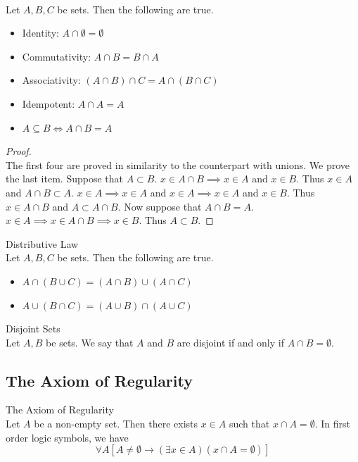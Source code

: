 \documentclass[a4paper]{article}
\begin{document}
\begin{prp}{}{}\\
Let $A,B,C$ be sets. Then the following are true. 
\begin{itemize}
\item Identity: $A\cap\emptyset=\emptyset$
\item Commutativity: $A\cap B=B\cap A$
\item Associativity: $(A\cap B)\cap C=A\cap(B\cap C)$
\item Idempotent: $A\cap A=A$
\item $A\subseteq B\iff A\cap B=A$
\end{itemize}
\begin{proof}\\
The first four are proved in similarity to the counterpart with unions. We prove the last item. Suppose that $A\subset B$. $x\in A\cap B\implies x\in A$ and $x\in B$. Thus $x\in A$ and $A\cap B\subset A$. $x\in A\implies x\in A$ and $x\in A\implies x\in A$ and $x\in B$. Thus $x\in A\cap B$ and $A\subset A\cap B$. Now suppose that $A\cap B=A$. $x\in A\implies x\in A\cap B\implies x\in B$. Thus $A\subset B$. 
\end{proof}
\end{prp}

\begin{prp}{Distributive Law}{}\\
Let $A,B,C$ be sets. Then the following are true. 
\begin{itemize}
\item $A\cap(B\cup C)=(A\cap B)\cup(A\cap C)$
\item $A\cup(B\cap C)=(A\cup B)\cap(A\cup C)$
\end{itemize}
\end{prp}

\begin{defn}{Disjoint Sets}{}\\
Let $A,B$ be sets. We say that $A$ and $B$ are disjoint if and only if $A\cap B=\emptyset$. 
\end{defn}

\subsection{The Axiom of Regularity}
\begin{axm}{The Axiom of Regularity}{}\\
Let $A$ be a non-empty set. Then there exists $x\in A$ such that $x\cap A=\emptyset$. In first order logic symbols, we have $$\forall A\left[A\neq\emptyset\to(\exists x\in A)(x\cap A=\emptyset)\right]$$
\end{axm}
\end{document}
